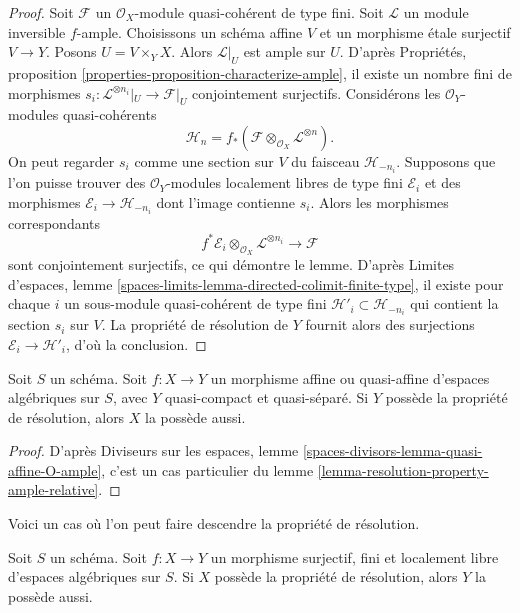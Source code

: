 \begin{proof}
Soit $\mathcal{F}$ un $\mathcal{O}_X$-module quasi-coh\'erent de type fini.
Soit $\mathcal{L}$ un module inversible $f$-ample.
Choisissons un sch\'ema affine $V$ et un morphisme \'etale surjectif
$V\to Y$. Posons $U=V\times_YX$. Alors $\mathcal{L}|_U$ est ample sur $U$.
D'apr\`es Propri\'et\'es, proposition
\ref{properties-proposition-characterize-ample}, il existe un nombre fini de
morphismes
$s_i:\mathcal{L}^{\otimes n_i}|_U\to\mathcal{F}|_U$ conjointement surjectifs.
Consid\'erons les $\mathcal{O}_Y$-modules quasi-coh\'erents
$$
\mathcal{H}_n =
f_*(\mathcal{F} \otimes_{\mathcal{O}_X} \mathcal{L}^{\otimes n}).
$$
On peut regarder $s_i$ comme une section sur $V$ du faisceau
$\mathcal{H}_{-n_i}$. Supposons que l'on puisse trouver des
$\mathcal{O}_Y$-modules localement libres de type fini $\mathcal{E}_i$ et des
morphismes $\mathcal{E}_i\to\mathcal{H}_{-n_i}$ dont l'image contienne $s_i$.
Alors les morphismes correspondants
$$
f^*\mathcal{E}_i
\otimes_{\mathcal{O}_X}
\mathcal{L}^{\otimes n_i} \longrightarrow \mathcal{F}
$$
sont conjointement surjectifs, ce qui d\'emontre le lemme. D'apr\`es Limites
d'espaces, lemme \ref{spaces-limits-lemma-directed-colimit-finite-type}, il
existe pour chaque $i$ un sous-module quasi-coh\'erent de type fini
$\mathcal{H}'_i\subset\mathcal{H}_{-n_i}$ qui contient la section $s_i$ sur
$V$. La propri\'et\'e de r\'esolution de $Y$ fournit alors des surjections
$\mathcal{E}_i\to\mathcal{H}'_i$, d'o\`u la conclusion.
\end{proof}

\begin{lemma}
\label{lemma-resolution-property-goes-up-affine}
Soit $S$ un sch\'ema.
Soit $f:X\to Y$ un morphisme affine ou quasi-affine d'espaces alg\'ebriques
sur $S$, avec $Y$ quasi-compact et quasi-s\'epar\'e.
Si $Y$ poss\`ede la propri\'et\'e de r\'esolution, alors $X$ la poss\`ede aussi.
\end{lemma}

\begin{proof}
D'apr\`es Diviseurs sur les espaces, lemme
\ref{spaces-divisors-lemma-quasi-affine-O-ample}, c'est un cas particulier du
lemme \ref{lemma-resolution-property-ample-relative}.
\end{proof}

\noindent
Voici un cas o\`u l'on peut faire descendre la propri\'et\'e de r\'esolution.

\begin{lemma}
\label{lemma-resolution-property-goes-down-finite-flat}
Soit $S$ un sch\'ema.
Soit $f:X\to Y$ un morphisme surjectif, fini et localement libre d'espaces
alg\'ebriques sur $S$.
Si $X$ poss\`ede la propri\'et\'e de r\'esolution, alors $Y$ la poss\`ede aussi.
\end{lemma}

